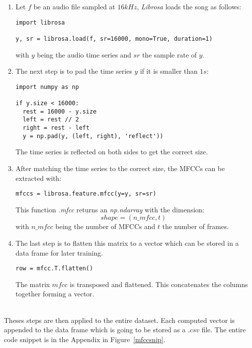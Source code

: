 \begin{enumerate}[label=\arabic*.]
  \item Let $f$ be an audio file sampled at $16kHz$, \textit{Librosa} loads the
song as follows:
\begin{lstlisting}
import librosa

y, sr = librosa.load(f, sr=16000, mono=True, duration=1)
\end{lstlisting}
with $y$ being the audio time series and $sr$ the sample rate of $y$.\\
\item The next step is to pad the time series $y$ if it is smaller than $1s$:
\begin{lstlisting}
import numpy as np

if y.size < 16000:
  rest = 16000 - y.size
  left = rest // 2
  right = rest - left
  y = np.pad(y, (left, right), 'reflect'))
\end{lstlisting}
The time series is reflected on both sides to get the correct size.\\
\item After matching the time series to the correct size, the MFCCs can be extracted
with:
\begin{lstlisting}
mfccs = librosa.feature.mfcc(y=y, sr=sr)
\end{lstlisting}
This function \textit{.mfcc\(\)} returns an \textit{np.ndarray} with the dimension:
\begin{equation*}
  shape=(n\_mfcc,t) 
\end{equation*}
with $n\_mfcc$ being the number of MFCCs and $t$ the number of frames.
\item The last step is to flatten this matrix to a vector which can be stored in a
  data frame for later training.
\begin{lstlisting}
row = mfcc.T.flatten() 
\end{lstlisting}
The matrix $mfcc$ is transposed and flattened. This concatenates the columns
together forming a vector.
\end{enumerate}~\\
Theses steps are then applied to the entire dataset. Each computed vector is
appended to the data frame which is going to be stored as a $.csv$ file. The
entire code snippet is in the Appendix in Figure~\ref{mfccsnip}.
